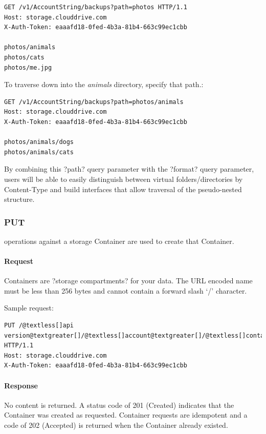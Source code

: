 \documentclass[letterpaper,10pt,english]{manual}
\begin{document}
\begin{Verbatim}[commandchars=@\[\]]
GET /v1/AccountString/backups?path=photos HTTP/1.1
Host: storage.clouddrive.com
X-Auth-Token: eaaafd18-0fed-4b3a-81b4-663c99ec1cbb

photos/animals
photos/cats
photos/me.jpg
\end{Verbatim}

To traverse down into the \emph{animals} directory, specify that path.:

\begin{Verbatim}[commandchars=@\[\]]
GET /v1/AccountString/backups?path=photos/animals
Host: storage.clouddrive.com
X-Auth-Token: eaaafd18-0fed-4b3a-81b4-663c99ec1cbb

photos/animals/dogs
photos/animals/cats
\end{Verbatim}

By combining this ?path? query parameter with the ?format? query
parameter, users will be able to easily distinguish between virtual
folders/directories by Content-Type and build interfaces that allow
traversal of the pseudo-nested structure.


\subsubsection{PUT}

 operations against a storage Container are used to create that
Container.


\paragraph{Request}

Containers are ?storage compartments? for your data.  The URL encoded
name must be less than 256 bytes and cannot contain a forward slash
`/' character.

Sample request:

\begin{Verbatim}[commandchars=@\[\]]
PUT /@textless[]api version@textgreater[]/@textless[]account@textgreater[]/@textless[]container@textgreater[] HTTP/1.1
Host: storage.clouddrive.com
X-Auth-Token: eaaafd18-0fed-4b3a-81b4-663c99ec1cbb
\end{Verbatim}


\paragraph{Response}

No content is returned. A status code of 201 (Created) indicates that the
Container was created as requested. Container  requests are
idempotent and a code of 202 (Accepted) is returned when the Container
already existed.
\end{document}
